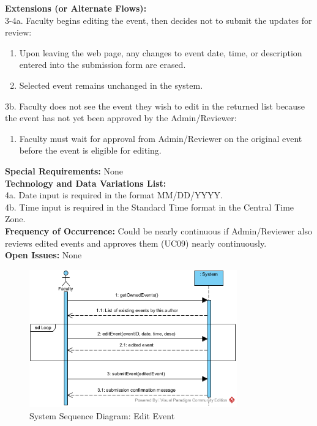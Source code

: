 \textbf{Extensions (or Alternate Flows):} \\
3-4a. Faculty begins editing the event, then decides not to submit the updates for review:
\begin{enumerate}
    \item Upon leaving the web page, any changes to event date, time, or description entered into the submission form are erased.
    \item Selected event remains unchanged in the system.
\end{enumerate}
3b. Faculty does not see the event they wish to edit in the returned list because the event has not yet been approved by the Admin/Reviewer:
\begin{enumerate}
    \item Faculty must wait for approval from Admin/Reviewer on the original event before the event is eligible for editing.
\end{enumerate}
\textbf{Special Requirements:} None \\
\textbf{Technology and Data Variations List:} \\
4a. Date input is required in the format MM/DD/YYYY. \\
4b. Time input is required in the Standard Time format in the Central Time Zone. \\
\textbf{Frequency of Occurrence:} Could be nearly continuous if Admin/Reviewer also reviews edited events and approves them (UC09) nearly continuously. \\
\textbf{Open Issues:} None \\

\begin{figure}[H]
    \centering
    \includegraphics[width=0.8\textwidth]{images/SSD-UC05-EditEvent.png}
    \centering
    \caption{System Sequence Diagram: Edit Event}
\end{figure}

